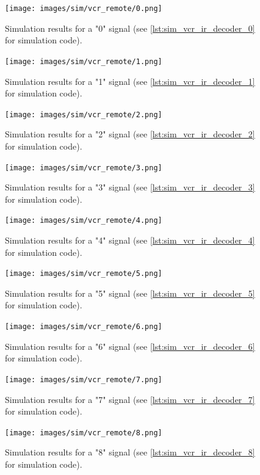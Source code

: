 \documentclass[a4paper]{article}
\begin{document}
\begin{figure}[H]
	\centering
	\texttt{[image: images/sim/vcr\_remote/0.png]}
	\caption{Simulation results for a "0" signal (see \autoref{lst:sim_vcr_ir_decoder_0} for simulation code).}
\end{figure}

\begin{figure}[H]
	\centering
	\texttt{[image: images/sim/vcr\_remote/1.png]}
	\caption{Simulation results for a "1" signal (see \autoref{lst:sim_vcr_ir_decoder_1} for simulation code).}
\end{figure}

\begin{figure}[H]
	\centering
	\texttt{[image: images/sim/vcr\_remote/2.png]}
	\caption{Simulation results for a "2" signal (see \autoref{lst:sim_vcr_ir_decoder_2} for simulation code).}
\end{figure}

\begin{figure}[H]
	\centering
	\texttt{[image: images/sim/vcr\_remote/3.png]}
	\caption{Simulation results for a "3" signal (see \autoref{lst:sim_vcr_ir_decoder_3} for simulation code).}
\end{figure}

\begin{figure}[H]
	\centering
	\texttt{[image: images/sim/vcr\_remote/4.png]}
	\caption{Simulation results for a "4" signal (see \autoref{lst:sim_vcr_ir_decoder_4} for simulation code).}
\end{figure}

\begin{figure}[H]
	\centering
	\texttt{[image: images/sim/vcr\_remote/5.png]}
	\caption{Simulation results for a "5" signal (see \autoref{lst:sim_vcr_ir_decoder_5} for simulation code).}
\end{figure}

\begin{figure}[H]
	\centering
	\texttt{[image: images/sim/vcr\_remote/6.png]}
	\caption{Simulation results for a "6" signal (see \autoref{lst:sim_vcr_ir_decoder_6} for simulation code).}
\end{figure}

\begin{figure}[H]
	\centering
	\texttt{[image: images/sim/vcr\_remote/7.png]}
	\caption{Simulation results for a "7" signal (see \autoref{lst:sim_vcr_ir_decoder_7} for simulation code).}
\end{figure}

\begin{figure}[H]
	\centering
	\texttt{[image: images/sim/vcr\_remote/8.png]}
	\caption{Simulation results for a "8" signal (see \autoref{lst:sim_vcr_ir_decoder_8} for simulation code).}
\end{figure}
\end{document}
